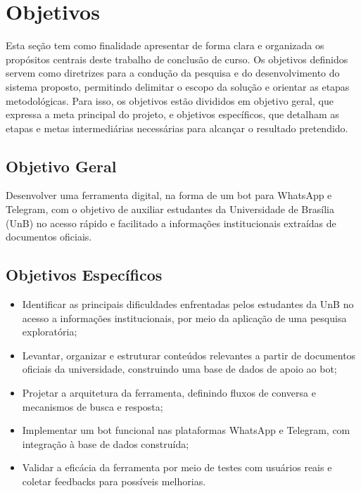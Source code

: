 \section{Objetivos}

Esta seção tem como finalidade apresentar de forma clara e organizada os propósitos centrais deste trabalho de conclusão de curso. Os objetivos definidos servem como diretrizes para a condução da pesquisa e do desenvolvimento do sistema proposto, permitindo delimitar o escopo da solução e orientar as etapas metodológicas. Para isso, os objetivos estão divididos em objetivo geral, que expressa a meta principal do projeto, e objetivos específicos, que detalham as etapas e metas intermediárias necessárias para alcançar o resultado pretendido.

\subsection{Objetivo Geral}

Desenvolver uma ferramenta digital, na forma de um bot para WhatsApp e Telegram, com o objetivo de auxiliar estudantes da Universidade de Brasília (UnB) no acesso rápido e facilitado a informações institucionais extraídas de documentos oficiais.

\subsection{Objetivos Específicos}

\begin{itemize}
    \item Identificar as principais dificuldades enfrentadas pelos estudantes da UnB no acesso a informações institucionais, por meio da aplicação de uma pesquisa exploratória;
    
    \item Levantar, organizar e estruturar conteúdos relevantes a partir de documentos oficiais da universidade, construindo uma base de dados de apoio ao bot;
    
    \item Projetar a arquitetura da ferramenta, definindo fluxos de conversa e mecanismos de busca e resposta;
    
    \item Implementar um bot funcional nas plataformas WhatsApp e Telegram, com integração à base de dados construída;
    
    \item Validar a eficácia da ferramenta por meio de testes com usuários reais e coletar feedbacks para possíveis melhorias.
\end{itemize}

